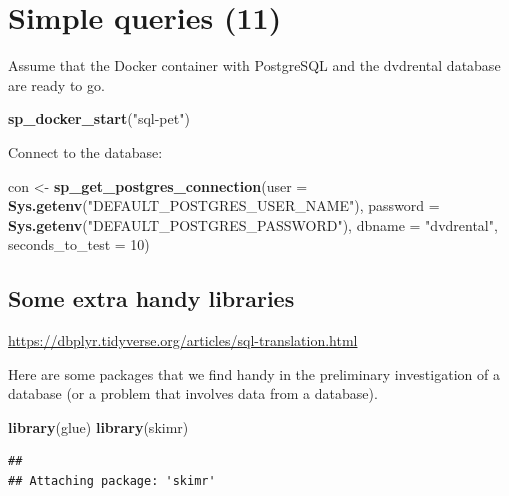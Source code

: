 \documentclass[]{book}
\newenvironment{Shaded}{\begin{snugshade}}{\end{snugshade}}
\newcommand{\DataTypeTok}[1]{\textcolor[rgb]{0.13,0.29,0.53}{#1}}
\newcommand{\DecValTok}[1]{\textcolor[rgb]{0.00,0.00,0.81}{#1}}
\newcommand{\KeywordTok}[1]{\textcolor[rgb]{0.13,0.29,0.53}{\textbf{#1}}}
\newcommand{\NormalTok}[1]{#1}
\newcommand{\StringTok}[1]{\textcolor[rgb]{0.31,0.60,0.02}{#1}}
\theoremstyle{definition}
\theoremstyle{definition}
\theoremstyle{definition}
\theoremstyle{remark}
\begin{document}
\hypertarget{simple-queries-11}{%
\chapter{Simple queries (11)}\label{simple-queries-11}}

Assume that the Docker container with PostgreSQL and the dvdrental
database are ready to go.

\begin{Shaded}
\begin{Highlighting}[]
\KeywordTok{sp_docker_start}\NormalTok{(}\StringTok{"sql-pet"}\NormalTok{)}
\end{Highlighting}
\end{Shaded}

Connect to the database:

\begin{Shaded}
\begin{Highlighting}[]
\NormalTok{con <-}\StringTok{ }\KeywordTok{sp_get_postgres_connection}\NormalTok{(}\DataTypeTok{user =} \KeywordTok{Sys.getenv}\NormalTok{(}\StringTok{"DEFAULT_POSTGRES_USER_NAME"}\NormalTok{),}
                         \DataTypeTok{password =} \KeywordTok{Sys.getenv}\NormalTok{(}\StringTok{"DEFAULT_POSTGRES_PASSWORD"}\NormalTok{),}
                         \DataTypeTok{dbname =} \StringTok{"dvdrental"}\NormalTok{,}
                         \DataTypeTok{seconds_to_test =} \DecValTok{10}\NormalTok{)}
\end{Highlighting}
\end{Shaded}

\hypertarget{some-extra-handy-libraries}{%
\section{Some extra handy libraries}\label{some-extra-handy-libraries}}

\url{https://dbplyr.tidyverse.org/articles/sql-translation.html}

Here are some packages that we find handy in the preliminary
investigation of a database (or a problem that involves data from a
database).

\begin{Shaded}
\begin{Highlighting}[]
\KeywordTok{library}\NormalTok{(glue)}
\KeywordTok{library}\NormalTok{(skimr)}
\end{Highlighting}
\end{Shaded}

\begin{verbatim}
## 
## Attaching package: 'skimr'
\end{verbatim}
\end{document}
